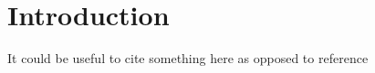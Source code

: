 
\section{Introduction}
\label{chpLitReview-secIntro}

It could be useful to cite something here as opposed to reference\cite{JackKurzweil2000}


